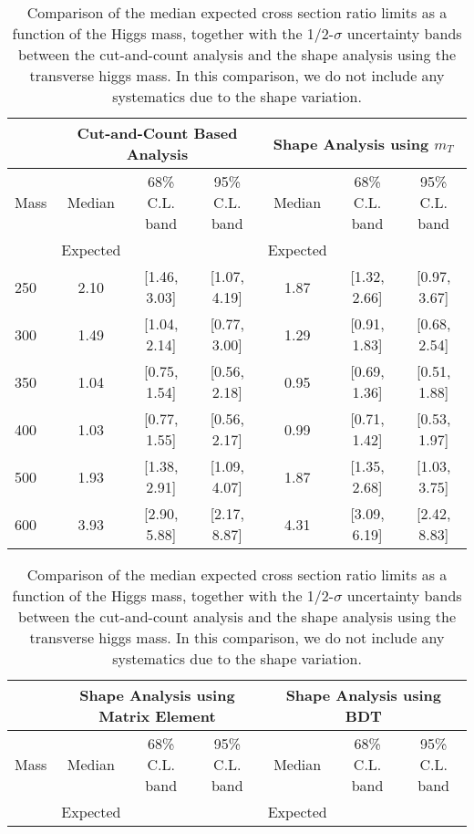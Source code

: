 \begin{table}[!ht]
\begin{center}
{\normalsize
\begin{tabular}{|l|c|c|c|c|c|c|}
\hline
      &  \multicolumn{3}{c|}{Cut-and-Count Based Analysis} &\multicolumn{3}{c|}{Shape Analysis using $m_T$} \\
\hline
Mass  &  Median      &     68\% C.L. band &  95\% C.L. band &  Median	   &	 68\% C.L. band &  95\% C.L. band\\
      &  Expected    &                    &                 &  Expected    &			&		 \\
\hline
250 & 2.10 & [1.46, 3.03] & [1.07, 4.19] & 1.87 & [1.32, 2.66] & [0.97, 3.67] \\
300 & 1.49 & [1.04, 2.14] & [0.77, 3.00] & 1.29 & [0.91, 1.83] & [0.68, 2.54] \\
350 & 1.04 & [0.75, 1.54] & [0.56, 2.18] & 0.95 & [0.69, 1.36] & [0.51, 1.88] \\
400 & 1.03 & [0.77, 1.55] & [0.56, 2.17] & 0.99 & [0.71, 1.42] & [0.53, 1.97] \\
500 & 1.93 & [1.38, 2.91] & [1.09, 4.07] & 1.87 & [1.35, 2.68] & [1.03, 3.75] \\
600 & 3.93 & [2.90, 5.88] & [2.17, 8.87] & 4.31 & [3.09, 6.19] & [2.42, 8.83] \\
\hline
\end{tabular}
}
\caption{Comparison of the median expected cross section ratio limits as a function 
of the Higgs mass, together with the 1/2-$\sigma$ uncertainty bands between the cut-and-count 
analysis and the shape analysis using the transverse higgs mass. In this comparison, we do not include any systematics due to 
the shape variation. }
\label{tab:mva_mtshapevscuts_hzz}
\end{center}
\begin{center}
{\normalsize
\begin{tabular}{|l|c|c|c|c|c|c|}
\hline
      &  \multicolumn{3}{c|}{Shape Analysis using Matrix Element} &\multicolumn{3}{c|}{Shape Analysis using BDT} \\
\hline
Mass  &  Median      &     68\% C.L. band &  95\% C.L. band &  Median	   &	 68\% C.L. band &  95\% C.L. band\\
      &  Expected    &                    &                 &  Expected    &			&		 \\

\end{tabular}}
\end{center}
\end{table}
